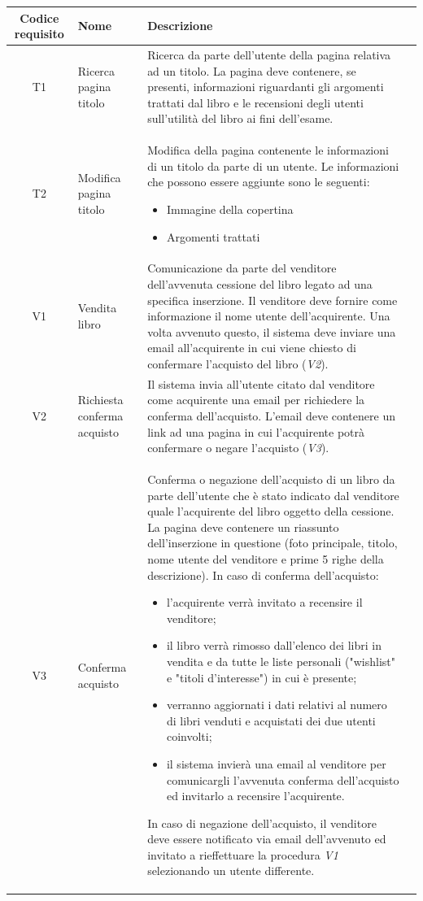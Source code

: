 \documentclass[10pt,a4paper]{article}
\begin{document}
	\begin{tabular}{cp{3cm}p{9cm}p{1cm}}
		Codice requisito&Nome&Descrizione\\ \hline
		T1&Ricerca pagina titolo&Ricerca da parte dell'utente della pagina relativa ad un titolo. La pagina deve contenere, se presenti, informazioni riguardanti gli argomenti trattati dal libro e le recensioni degli utenti sull'utilità del libro ai fini dell'esame.\\ \hline
		T2&Modifica pagina titolo&Modifica della pagina contenente le informazioni di un titolo da parte di un utente. Le informazioni che possono essere aggiunte sono le seguenti:
		\begin{itemize}
			\item Immagine della copertina
			\item Argomenti trattati
		\end{itemize}\\ \hline
		V1&Vendita libro&Comunicazione da parte del venditore dell'avvenuta cessione del libro legato ad una specifica inserzione. Il venditore deve fornire come informazione il nome utente dell'acquirente. Una volta avvenuto questo, il sistema deve inviare una email all'acquirente in cui viene chiesto di confermare l'acquisto del libro (\textit{V2}).\\ \hline
		V2&Richiesta conferma acquisto&Il sistema invia all'utente citato dal venditore come acquirente una email per richiedere la conferma dell'acquisto. L'email deve contenere un link ad una pagina in cui l'acquirente potrà confermare o negare l'acquisto (\textit{V3}).\\ \hline
		V3&Conferma acquisto&Conferma o negazione dell'acquisto di un libro da parte dell'utente che è stato indicato dal venditore quale l'acquirente del libro oggetto della cessione. La pagina deve contenere un riassunto dell'inserzione in questione (foto principale, titolo, nome utente del venditore e prime 5 righe della descrizione).
		In caso di conferma dell'acquisto:
		\begin{itemize}
			\item l'acquirente verrà invitato a recensire il venditore;
			\item il libro verrà rimosso dall'elenco dei libri in vendita e da tutte le liste personali ("wishlist" e "titoli d'interesse") in cui è presente;
			\item verranno aggiornati i dati relativi al numero di libri venduti e acquistati dei due utenti coinvolti;
			\item il sistema invierà una email al venditore per comunicargli l'avvenuta conferma dell'acquisto ed invitarlo a recensire l'acquirente.
		\end{itemize}
		In caso di negazione dell'acquisto, il venditore deve essere notificato via email dell'avvenuto ed invitato a rieffettuare la procedura \textit{V1} selezionando un utente differente. \\ \hline
	\end{tabular}
\end{document}
